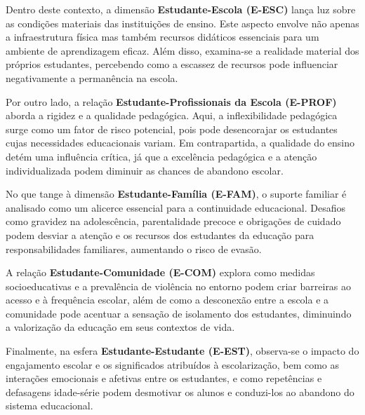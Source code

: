 Dentro deste contexto, a dimensão \textbf{Estudante-Escola (E-ESC)} lança luz sobre as condições materiais das instituições de ensino. Este aspecto envolve não apenas a infraestrutura física mas também recursos didáticos essenciais para um ambiente de aprendizagem eficaz. Além disso, examina-se a realidade material dos próprios estudantes, percebendo como a escassez de recursos pode influenciar negativamente a permanência na escola.

Por outro lado, a relação \textbf{Estudante-Profissionais da Escola (E-PROF)} aborda a rigidez e a qualidade pedagógica. Aqui, a inflexibilidade pedagógica surge como um fator de risco potencial, pois pode desencorajar os estudantes cujas necessidades educacionais variam. Em contrapartida, a qualidade do ensino detém uma influência crítica, já que a excelência pedagógica e a atenção individualizada podem diminuir as chances de abandono escolar.

No que tange à dimensão \textbf{Estudante-Família (E-FAM)}, o suporte familiar é analisado como um alicerce essencial para a continuidade educacional. Desafios como gravidez na adolescência, parentalidade precoce e obrigações de cuidado podem desviar a atenção e os recursos dos estudantes da educação para responsabilidades familiares, aumentando o risco de evasão.

A relação \textbf{Estudante-Comunidade (E-COM)} explora como medidas socioeducativas e a prevalência de violência no entorno podem criar barreiras ao acesso e à frequência escolar, além de como a desconexão entre a escola e a comunidade pode acentuar a sensação de isolamento dos estudantes, diminuindo a valorização da educação em seus contextos de vida.

Finalmente, na esfera \textbf{Estudante-Estudante (E-EST)}, observa-se o impacto do engajamento escolar e os significados atribuídos à escolarização, bem como as interações emocionais e afetivas entre os estudantes, e como repetências e defasagens idade-série podem desmotivar os alunos e conduzi-los ao abandono do sistema educacional.


